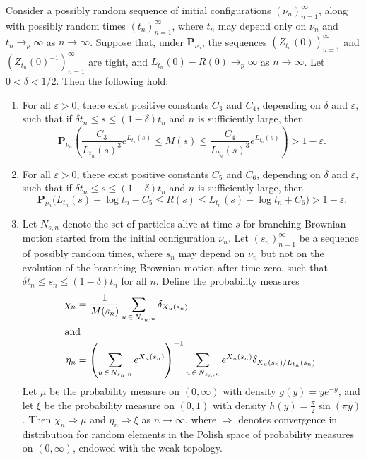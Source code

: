 \documentclass[AHL,Unicode,longabstracts,published]{cedram}
\newcommand*\eps{\varepsilon}
\renewcommand*\P{\mathbf{P}}
\newcommand{\1} {\mathds{1}}
\begin{document}
\begin{prop}\label{configpropnew}
Consider a possibly random sequence of initial configurations $(\nu_n)_{n=1}^{\infty}$, along with possibly random times $(t_n)_{n=1}^{\infty}$, where $t_n$ may depend only on $\nu_n$ and $t_n \rightarrow_p \infty$ as $n \rightarrow \infty$. Suppose that, under $\P_{\nu_n}$, the sequences $(Z_{t_n}(0))_{n=1}^{\infty}$ and $(Z_{t_n}(0)^{-1})_{n=1}^{\infty}$ are tight, and $L_{t_n}(0) - R(0) \rightarrow_p \infty$ as $n \rightarrow \infty$. Let $0 < \delta < 1/2$. Then the following hold:
\begin{enumerate}
\item\label{prop2.6.1} For all $\eps > 0$, there exist positive constants $C_3$ and $C_4$, depending on $\delta$ and $\eps$, such that if $\delta t_n \leq s \leq (1 - \delta)t_n$ and $n$ is sufficiently large, then
\begin{equation}\label{configconc1}
\P_{\nu_n} \left(\frac{C_3}{L_{t_n}(s)^3} e^{L_{t_n}(s)} \leq M(s) \leq \frac{C_4}{L_{t_n}(s)^3} e^{L_{t_n}(s)} \right) > 1 - \eps.
\end{equation}

\item\label{prop2.6.2} For all $\eps > 0$, there exist positive constants $C_5$ and $C_6$, depending on $\delta$ and $\eps$, such that if $\delta t_n \leq s \leq (1 - \delta)t_n$ and $n$ is sufficiently large, then
\begin{equation}\label{configconc2}
\P_{\nu_n} \big(L_{t_n}(s) - \log t_n - C_5 \leq R(s) \leq L_{t_n}(s) - \log t_n + C_6 \big) > 1 - \eps.
\end{equation}

\item\label{prop2.6.3} Let $N_{s,n}$ denote the set of particles alive at time $s$ for branching Brownian motion started from the initial configuration $\nu_n$. Let $(s_n)_{n=1}^{\infty}$ be a sequence of possibly random times, where $s_n$ may depend on $\nu_n$ but not on the evolution of the branching Brownian motion after time zero, such that $\delta t_n \leq s_n \leq (1 - \delta) t_n$ for all $n$. Define the probability measures
\begin{align*}
\chi_n &= \frac{1}{M(s_n)} \sum_{u\,\in\,N_{s_n,n}} \delta_{X_u(s_n)}
\\
\intertext{and}
\eta_n &= \left(\sum_{u\,\in\,N_{s_n,n}} e^{X_u(s_n)} \right)^{-1} \sum_{u\,\in\,N_{s_n,n}} e^{X_u(s_n)} \delta_{X_u(s_n)/L_{t_n}(s_n)}.
\end{align*}
Let $\mu$ be the probability measure on $(0, \infty)$ with density $g(y) = ye^{-y}$, and let $\xi$ be the probability measure on $(0,1)$ with density $h(y) = \frac{\pi}{2} \sin(\pi y)$. Then $\chi_n \Rightarrow \mu$ and $\eta_n \Rightarrow \xi$ as $n \rightarrow \infty$, where $\Rightarrow$ denotes convergence in distribution for random elements in the Polish space of probability measures on $(0, \infty)$, endowed with the weak topology.
\end{enumerate}
\end{prop}
\end{document}
